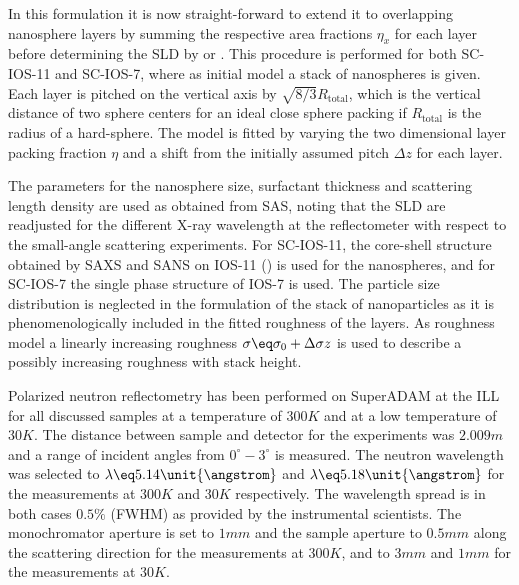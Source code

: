 \documentclass[\main/dresen_thesis.tex]{subfiles}
\begin{document}
    In this formulation it is now straight-forward to extend it to overlapping nanosphere layers by summing the respective area fractions $\eta_x$ for each layer before determining the SLD by  or .
    This procedure is performed for both SC-IOS-11 and SC-IOS-7, where as initial model a stack of nanospheres is given.
    Each layer is pitched on the vertical axis by $\sqrt{8/3} R_\mathrm{total}$, which is the vertical distance of two sphere centers for an ideal close sphere packing if $R_\mathrm{total}$ is the radius of a hard-sphere.
    The model is fitted by varying the two dimensional layer packing fraction $\eta$ and a shift from the initially assumed pitch $\Delta z$ for each layer.

    The parameters for the nanosphere size, surfactant thickness and scattering length density are used as obtained from SAS, noting that the SLD are readjusted for the different X-ray wavelength at the reflectometer with respect
    to the small-angle scattering experiments.
    For SC-IOS-11, the core-shell structure obtained by SAXS and SANS on IOS-11 () is used for the nanospheres, and for SC-IOS-7 the single phase structure of IOS-7 is used.
    The particle size distribution is neglected in the formulation of the stack of nanoparticles as it is phenomenologically included in the fitted roughness of the layers.
    As roughness model a linearly increasing roughness $\sigma \eq \sigma_0 + \Delta \sigma z$ is used to describe a possibly increasing roughness with stack height.

    Polarized neutron reflectometry has been performed on SuperADAM at the ILL for all discussed samples at a temperature of $300 \unit{K}$ and at a low temperature of $30 \unit{K}$.
    The distance between sample and detector for the experiments was $2.009 \unit{m}$ and a range of incident angles from $0 ^\circ - 3 ^\circ$ is measured.
    The neutron wavelength was selected to $\lambda \eq 5.14 \unit{\angstrom}$ and $\lambda \eq 5.18 \unit{\angstrom}$ for the measurements at $300 \unit{K}$ and $30 \unit{K}$ respectively.
    The wavelength spread is in both cases $0.5 \%$ (FWHM) as provided by the instrumental scientists.
    The monochromator aperture is set to $1 \unit{mm}$ and the sample aperture to $0.5 \unit{mm}$ along the scattering direction for the measurements at $300 \unit{K}$, and to $3 \unit{mm}$ and $1 \unit{mm}$ for the measurements at $30 \unit{K}$.
\end{document}
